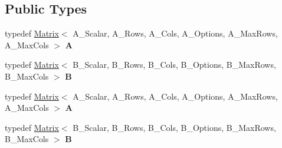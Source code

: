 \subsection*{Public Types}
\begin{DoxyCompactItemize}
\item 
\mbox{\label{struct_eigen_1_1internal_1_1make__coherent__impl_3_01_matrix_3_01_a___scalar_00_01_a___rows_00_02c107ffcc218caac688e11f3e382ff61_a4f14df60079e0a62ff60db3b1ced5893}} 
typedef \hyperlink{group___core___module_class_eigen_1_1_matrix}{Matrix}$<$ A\+\_\+\+Scalar, A\+\_\+\+Rows, A\+\_\+\+Cols, A\+\_\+\+Options, A\+\_\+\+Max\+Rows, A\+\_\+\+Max\+Cols $>$ {\bfseries A}
\item 
\mbox{\label{struct_eigen_1_1internal_1_1make__coherent__impl_3_01_matrix_3_01_a___scalar_00_01_a___rows_00_02c107ffcc218caac688e11f3e382ff61_adad7107b006e6205a74e332850e6f12d}} 
typedef \hyperlink{group___core___module_class_eigen_1_1_matrix}{Matrix}$<$ B\+\_\+\+Scalar, B\+\_\+\+Rows, B\+\_\+\+Cols, B\+\_\+\+Options, B\+\_\+\+Max\+Rows, B\+\_\+\+Max\+Cols $>$ {\bfseries B}
\item 
\mbox{\label{struct_eigen_1_1internal_1_1make__coherent__impl_3_01_matrix_3_01_a___scalar_00_01_a___rows_00_02c107ffcc218caac688e11f3e382ff61_a4f14df60079e0a62ff60db3b1ced5893}} 
typedef \hyperlink{group___core___module_class_eigen_1_1_matrix}{Matrix}$<$ A\+\_\+\+Scalar, A\+\_\+\+Rows, A\+\_\+\+Cols, A\+\_\+\+Options, A\+\_\+\+Max\+Rows, A\+\_\+\+Max\+Cols $>$ {\bfseries A}
\item 
\mbox{\label{struct_eigen_1_1internal_1_1make__coherent__impl_3_01_matrix_3_01_a___scalar_00_01_a___rows_00_02c107ffcc218caac688e11f3e382ff61_adad7107b006e6205a74e332850e6f12d}} 
typedef \hyperlink{group___core___module_class_eigen_1_1_matrix}{Matrix}$<$ B\+\_\+\+Scalar, B\+\_\+\+Rows, B\+\_\+\+Cols, B\+\_\+\+Options, B\+\_\+\+Max\+Rows, B\+\_\+\+Max\+Cols $>$ {\bfseries B}
\end{DoxyCompactItemize}
